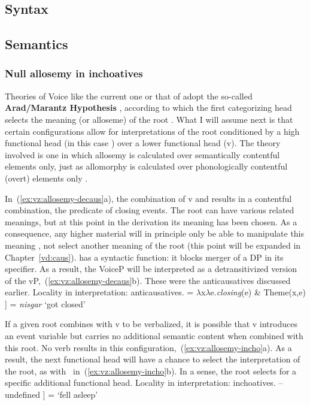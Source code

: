 {	\subsection{Syntax} \label{vz:vz:syn}

	\subsection{Semantics} \label{vz:vz:sem}
  		\subsubsection{Null allosemy in inchoatives} \label{vz:inch:analysis}
Theories of Voice like the current one or that of \cite{layering15} adopt the so-called \textbf{Arad/Marantz Hypothesis} \citep{elenasamioti14}, according to which the first categorizing head selects the meaning (or alloseme) of the root \citep{arad03,marantz13}. What I will assume next is that certain configurations allow for interpretations of the root conditioned by a high functional head (in this case {\vz}) over a lower functional head (v). The theory involved is one in which allosemy is calculated over semantically contentful elements only, just as allomorphy is calculated over phonologically contentful (overt) elements only \citep{marantz13,kastner18nllt}.

In~(\ref{ex:vz:allosemy-decaus}a), the combination of v and  results in a contentful combination, the predicate of closing events. The root can have various related meanings, but at this point in the derivation its meaning has been chosen. As a consequence, any higher material will in principle only be able to manipulate this meaning \citep{arad03}, not select another meaning of the root (this point will be expanded in Chapter~\ref{vd:caus}). {\vz} has a syntactic function: it blocks merger of a DP in its specifier. As a result, the VoiceP will be interpreted as a detransitivized version of the vP,~(\ref{ex:vz:allosemy-decaus}b). These were the anticausatives discussed earlier.
\pex Locality in interpretation: anticausatives.\label{ex:vz:allosemy-decaus}
    \a {} = $\lambda$x$\lambda$e.\emph{closing}(e) \& Theme(x,e)
    \a {[} \fbox{\textbf{\vz}}  ] = \emph{nisgar} `got closed'
\xe

If a given root combines with v to be verbalized, it is possible that v introduces an event variable but carries no additional semantic content when combined with this root. No verb results in this configuration,~(\ref{ex:vz:allosemy-incho}a). As a result, the next functional head will have a chance to select the interpretation of the root, as with \vz~in~(\ref{ex:vz:allosemy-incho}b). In a sense, the root selects for a specific additional functional head.
\pex Locality in interpretation: inchoatives.\label{ex:vz:allosemy-incho}
    \a {} -- undefined
    \a {[} \fbox{\textbf{\vz}}  ] = `fell asleep'
\xe

}
